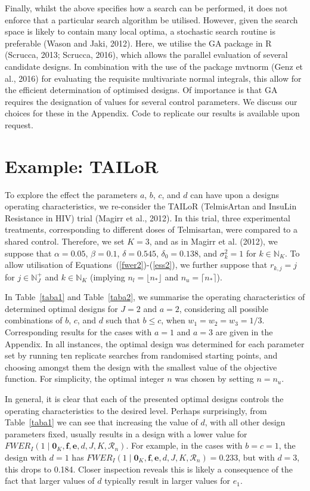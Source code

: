 \documentclass{article}
\numberwithin{equation}{section}
\theoremstyle{plain}
\begin{document}
Finally, whilst the above specifies how a search can be performed, it does not enforce that a particular search algorithm be utilised. However, given the search space is likely to contain many local optima, a stochastic search routine is preferable (Wason and Jaki, 2012). Here, we utilise the GA package in R (Scrucca, 2013; Scrucca, 2016), which allows the parallel evaluation of several candidate designs. In combination with the use of the package mvtnorm (Genz et al., 2016) for evaluating the requisite multivariate normal integrals, this allow for the efficient determination of optimised designs. Of importance is that GA requires the designation of values for several control parameters. We discuss our choices for these in the Appendix. Code to replicate our results is available upon request.

\section{Example: TAILoR}\label{tailor}

To explore the effect the parameters $a$, $b$, $c$, and $d$ can have upon a designs operating characteristics, we re-consider the TAILoR (TelmisArtan and InsuLin Resistance in HIV) trial (Magirr et al., 2012). In this trial, three experimental treatments, corresponding to different doses of Telmisartan, were compared to a shared control. Therefore, we set $K=3$, and as in Magirr et al. (2012), we suppose that $\alpha=0.05$, $\beta=0.1$, $\delta=0.545$, $\delta_0=0.138$, and $\sigma_k^2=1$ for $k\in\mathbb{N}_K$. To allow utilisation of Equations~(\ref{fwer2})-(\ref{ess2}), we further suppose that $r_{k,j}=j$ for $j\in\mathbb{N}_J^+$ and $k\in\mathbb{N}_K$ (implying $n_l=\lfloor n_*\rfloor$ and $n_u=\lceil n_*\rceil$).

In Table~\ref{taba1} and Table~\ref{taba2}, we summarise the operating characteristics of determined optimal designs for $J=2$ and $a=2$, considering all possible combinations of $b$, $c$, and $d$ such that $b\le c$, when $w_1=w_2=w_3=1/3$. Corresponding results for the cases with $a=1$ and $a=3$ are given in the Appendix. In all instances, the optimal design was determined for each parameter set by running ten replicate searches from randomised starting points, and choosing amongst them the design with the smallest value of the objective function. For simplicity, the optimal integer $n$ was chosen by setting $n=n_u$.

In general, it is clear that each of the presented optimal designs controls the operating characteristics to the desired level. Perhaps surprisingly, from Table~\ref{taba1} we can see that increasing the value of $d$, with all other design parameters fixed, usually results in a design with a lower value for $FWER_I(1\mid\boldsymbol{0}_K,\boldsymbol{f},\boldsymbol{e},d,J,K,\mathscr{R}_n)$. For example, in the cases with $b=c=1$, the design with $d=1$ has $FWER_I(1\mid\boldsymbol{0}_K,\boldsymbol{f},\boldsymbol{e},d,J,K,\mathscr{R}_n)=0.233$, but with $d=3$, this drops to 0.184. Closer inspection reveals this is likely a consequence of the fact that larger values of $d$ typically result in larger values for $e_1$.
\end{document}
